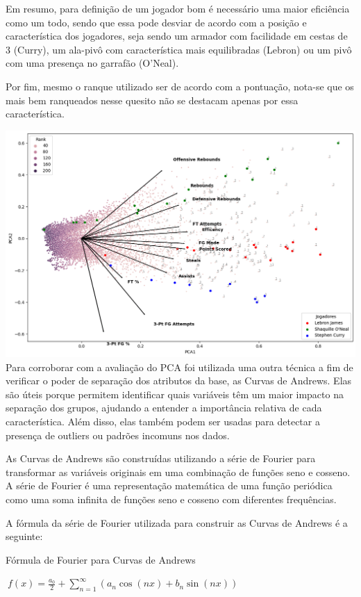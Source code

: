 \documentclass[
]{book}
\begin{document}
Em resumo, para definição de um jogador bom é necessário uma maior eficiência como um todo, sendo que essa pode desviar de acordo com a posição e característica dos jogadores, seja sendo um armador com facilidade em cestas de 3 (Curry), um ala-pivô com característica mais equilibradas (Lebron) ou um pivô com uma presença no garrafão (O'Neal).

Por fim, mesmo o ranque utilizado ser de acordo com a pontuação, nota-se que os mais bem ranqueados nesse quesito não se destacam apenas por essa característica.

\includegraphics{imagens/6.png} Para corroborar com a avaliação do PCA foi utilizada uma outra técnica a fim de verificar o poder de separação dos atributos da base, as Curvas de Andrews. Elas são úteis porque permitem identificar quais variáveis têm um maior impacto na separação dos grupos, ajudando a entender a importância relativa de cada característica. Além disso, elas também podem ser usadas para detectar a presença de outliers ou padrões incomuns nos dados.

As Curvas de Andrews são construídas utilizando a série de Fourier para transformar as variáveis originais em uma combinação de funções seno e cosseno. A série de Fourier é uma representação matemática de uma função periódica como uma soma infinita de funções seno e cosseno com diferentes frequências.

A fórmula da série de Fourier utilizada para construir as Curvas de Andrews é a seguinte:

Fórmula de Fourier para Curvas de Andrews

\(\ f(x) = \frac{a_0}{2} + \sum_{n=1}^{\infty} \left( a_n \cos(nx) + b_n \sin(nx) \right)\)
\end{document}
